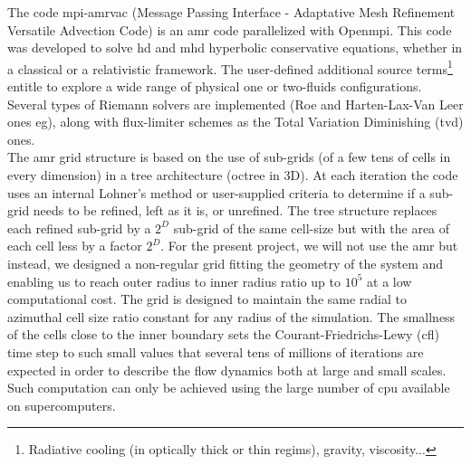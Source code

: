 \documentclass[
    a4paper, 
    12pt, onecolumn,
]{article}
\begin{document}
\indent \indent The code {\sc mpi-amrvac} (Message Passing Interface - Adaptative Mesh Refinement Versatile Advection Code) is an {\sc amr} code parallelized with Open{\sc mpi}. This code was developed to solve {\sc hd} and {\sc mhd} hyperbolic conservative equations, whether in a classical or a relativistic framework. The user-defined additional source terms\footnote{Radiative cooling (in optically thick or thin regims), gravity, viscosity...} entitle to explore a wide range of physical one or two-fluids configurations. Several types of R{\sc iemann} solvers are implemented (R{\sc oe} and H{\sc arten}-L{\sc ax}-V{\sc an} L{\sc eer} ones eg), along with flux-limiter schemes as the Total Variation Diminishing ({\sc tvd}) ones.\\
\indent The {\sc amr} grid structure is based on the use of sub-grids (of a few tens of cells in every dimension) in a tree architecture (octree in 3D). At each iteration the code uses an internal L{\sc ohner}'s method or user-supplied criteria to determine if a sub-grid needs to be refined, left as it is, or unrefined. The tree structure replaces each refined sub-grid by a $2^D$ sub-grid of the same cell-size but with the area of each cell less by a factor $2^D$. For the present project, we will not use the {\sc amr} but instead, we designed a non-regular grid fitting the geometry of the system and enabling us to reach outer radius to inner radius ratio up to $10^5$ at a low computational cost. The grid is designed to maintain the same radial to azimuthal cell size ratio constant for any radius of the simulation. The smallness of the cells close to the inner boundary sets the C{\sc ourant}-F{\sc riedrichs}-L{\sc ewy} ({\sc cfl}) time step to such small values that several tens of millions of iterations are expected in order to describe the flow dynamics both at large and small scales. Such computation can only be achieved using the large number of {\sc cpu} available on supercomputers.
\newline
\end{document}

